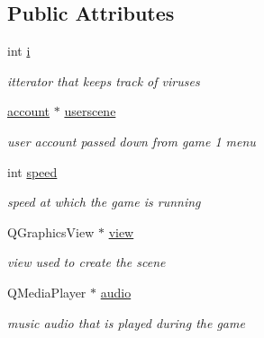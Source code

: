 \subsection*{Public Attributes}
\begin{DoxyCompactItemize}
\item 
\mbox{\label{classgame1scene_a9bb7b87c40db20bd49eea5a19e94e0f2}} 
int \hyperlink{classgame1scene_a9bb7b87c40db20bd49eea5a19e94e0f2}{i}
\begin{DoxyCompactList}\small\item\em itterator that keeps track of viruses \end{DoxyCompactList}\item 
\mbox{\label{classgame1scene_aabc6298d95ee1230f29a8985c9a176cd}} 
\hyperlink{classaccount}{account} $\ast$ \hyperlink{classgame1scene_aabc6298d95ee1230f29a8985c9a176cd}{userscene}
\begin{DoxyCompactList}\small\item\em user account passed down from game 1 menu \end{DoxyCompactList}\item 
\mbox{\label{classgame1scene_aa8889d693d30062bc43c6bfa802c3baa}} 
int \hyperlink{classgame1scene_aa8889d693d30062bc43c6bfa802c3baa}{speed}
\begin{DoxyCompactList}\small\item\em speed at which the game is running \end{DoxyCompactList}\item 
\mbox{\label{classgame1scene_a15893603342e72e41e5d74751c58b34d}} 
Q\+Graphics\+View $\ast$ \hyperlink{classgame1scene_a15893603342e72e41e5d74751c58b34d}{view}
\begin{DoxyCompactList}\small\item\em view used to create the scene \end{DoxyCompactList}\item 
\mbox{\label{classgame1scene_a4f82c0adb37a7ab736e765a4d9a87955}} 
Q\+Media\+Player $\ast$ \hyperlink{classgame1scene_a4f82c0adb37a7ab736e765a4d9a87955}{audio}
\begin{DoxyCompactList}\small\item\em music audio that is played during the game \end{DoxyCompactList}\item 

\end{DoxyCompactItemize}
